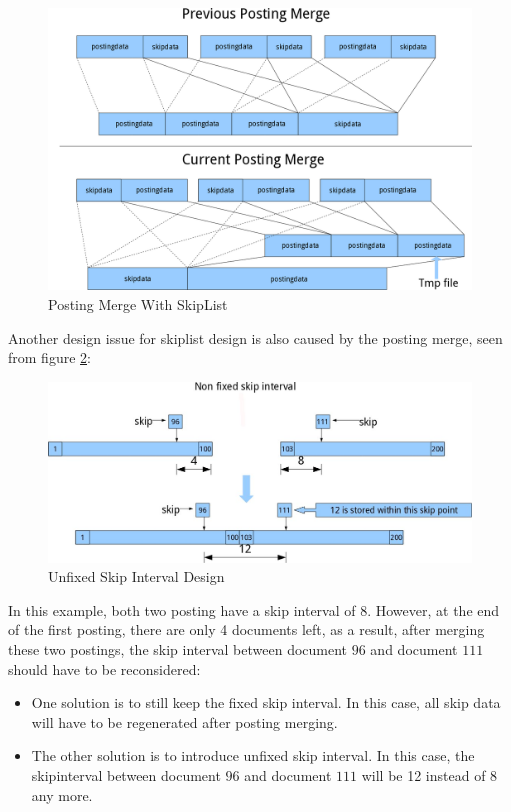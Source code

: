 \begin{figure}[h!]
\centerline{\includegraphics[width=.8\textwidth]{Figures/skipmerge.png}}
\caption{Posting Merge With SkipList}\label{skiplist-merge}
\end{figure}


Another design issue for skiplist design is also caused by the posting merge, seen from figure \ref{skiplist-interval}:
\begin{figure}[h!]
\centerline{\includegraphics[width=.8\textwidth]{Figures/skipinterval.jpg}}
\caption{Unfixed Skip Interval Design}\label{skiplist-interval}
\end{figure}

In this example, both two posting have a skip interval of 8. However, at the end of the first posting, there are only 4 documents left, as a result, after merging these two postings, the skip interval between document $96$ and
document $111$ should have to be reconsidered:
\begin{itemize}
 \item One solution is to still keep the fixed skip interval. In this case, all skip data will have to be regenerated after posting merging.
 \item The other solution is to introduce unfixed skip interval. In this case, the skipinterval between document $96$ and document $111$ will be 12 instead of 8 any more.
\end{itemize}

